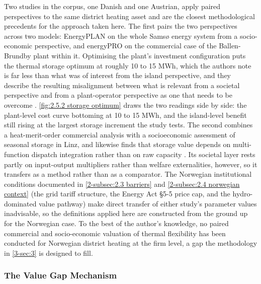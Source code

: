 Two studies in the corpus, one Danish and one Austrian, apply paired perspectives to the same district heating asset and are the closest methodological precedents for the approach taken here. The first pairs the two perspectives across two models: EnergyPLAN on the whole Samsø energy system from a socio-economic perspective, and energyPRO on the commercial case of the Ballen-Brundby plant within it. Optimising the plant's investment configuration puts the thermal storage optimum at roughly 10 to 15 MWh, which the authors note is far less than what was of interest from the island perspective, and they describe the resulting misalignment between what is relevant from a societal perspective and from a plant-operator perspective as one that needs to be overcome \cite{ostergaard_business_2019}. \autoref{fig:2.5.2 storage optimum} draws the two readings side by side: the plant-level cost curve bottoming at 10 to 15 MWh, and the island-level benefit still rising at the largest storage increment the study tests. The second combines a heat-merit-order commercial analysis with a socioeconomic assessment of seasonal storage in Linz, and likewise finds that storage value depends on multi-function dispatch integration rather than on raw capacity \cite{moser_socioeconomic_2018}. Its societal layer rests partly on input-output multipliers rather than welfare externalities, however, so it transfers as a method rather than as a comparator. The Norwegian institutional conditions documented in \autoref{2-subsec:2.3 barriers} and \autoref{2-subsec:2.4 norwegian context} (the grid tariff structure, the Energy Act §5-5 price cap, and the hydro-dominated value pathway) make direct transfer of either study's parameter values inadvisable, so the definitions applied here are constructed from the ground up for the Norwegian case. To the best of the author's knowledge, no paired commercial and socio-economic valuation of thermal flexibility has been conducted for Norwegian district heating at the firm level, a gap the methodology in \autoref{3-sec:3} is designed to fill.



\subsubsection{The Value Gap Mechanism}

\label{2-subsec:2.5.2 value gap}

